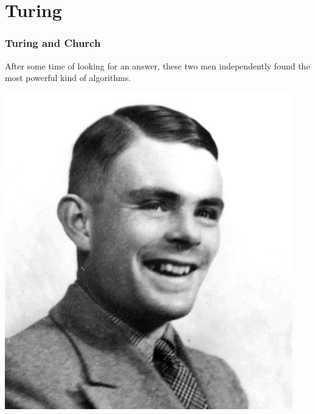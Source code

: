 \documentclass[mathserif]{beamer}
\begin{document}
\section{Turing}
\begin{frame}
  \frametitle{Turing and Church}

  After some time of looking for an answer, these two men independently found
  the most powerful kind of algorithms.
  \begin{multicols}{2}
    \includegraphics[width=0.9\linewidth]{media/turing.jpg}


\end{multicols}
\end{frame}
\end{document}
